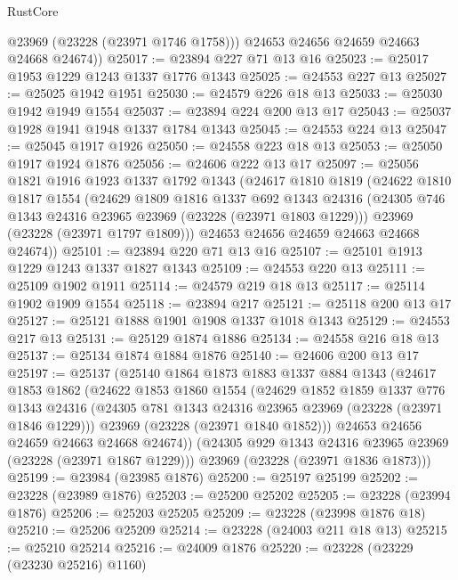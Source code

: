 \begin{lexlean}{RustCore}
\begin{coremodule}
          @23969
          (@23228 (@23971 @1746 @1758)))
        @24653
        @24656
        @24659
        @24663
        @24668
        @24674))
@25017 := @23894 @227 @71 @13 @16
@25023 := @25017 @1953 @1229 @1243 @1337 @1776 @1343
@25025 := @24553 @227 @13
@25027 := @25025 @1942 @1951
@25030 := @24579 @226 @18 @13
@25033 := @25030 @1942 @1949 @1554
@25037 := @23894 @224 @200 @13 @17
@25043 := @25037 @1928 @1941 @1948 @1337 @1784 @1343
@25045 := @24553 @224 @13
@25047 := @25045 @1917 @1926
@25050 := @24558 @223 @18 @13
@25053 := @25050 @1917 @1924 @1876
@25056 := @24606 @222 @13 @17
@25097 := @25056
    @1821
    @1916
    @1923
    @1337
    @1792
    @1343
    (@24617
      @1810
      @1819
      (@24622
        @1810
        @1817
        @1554
        (@24629
          @1809
          @1816
          @1337
          @692
          @1343
          @24316
          (@24305 @746 @1343 @24316 @23965 @23969 (@23228 (@23971 @1803 @1229)))
          @23969
          (@23228 (@23971 @1797 @1809)))
        @24653
        @24656
        @24659
        @24663
        @24668
        @24674))
@25101 := @23894 @220 @71 @13 @16
@25107 := @25101 @1913 @1229 @1243 @1337 @1827 @1343
@25109 := @24553 @220 @13
@25111 := @25109 @1902 @1911
@25114 := @24579 @219 @18 @13
@25117 := @25114 @1902 @1909 @1554
@25118 := @23894 @217
@25121 := @25118 @200 @13 @17
@25127 := @25121 @1888 @1901 @1908 @1337 @1018 @1343
@25129 := @24553 @217 @13
@25131 := @25129 @1874 @1886
@25134 := @24558 @216 @18 @13
@25137 := @25134 @1874 @1884 @1876
@25140 := @24606 @200 @13 @17
@25197 := @25137
    (@25140
      @1864
      @1873
      @1883
      @1337
      @884
      @1343
      (@24617
        @1853
        @1862
        (@24622
          @1853
          @1860
          @1554
          (@24629
            @1852
            @1859
            @1337
            @776
            @1343
            @24316
            (@24305 @781 @1343 @24316 @23965 @23969 (@23228 (@23971 @1846 @1229)))
            @23969
            (@23228 (@23971 @1840 @1852)))
          @24653
          @24656
          @24659
          @24663
          @24668
          @24674))
      (@24305 @929 @1343 @24316 @23965 @23969 (@23228 (@23971 @1867 @1229)))
      @23969
      (@23228 (@23971 @1836 @1873)))
@25199 := @23984 (@23985 @1876)
@25200 := @25197 @25199
@25202 := @23228 (@23989 @1876)
@25203 := @25200 @25202
@25205 := @23228 (@23994 @1876)
@25206 := @25203 @25205
@25209 := @23228 (@23998 @1876 @18)
@25210 := @25206 @25209
@25214 := @23228 (@24003 @211 @18 @13)
@25215 := @25210 @25214
@25216 := @24009 @1876
@25220 := @23228 (@23229 (@23230 @25216) @1160)

\end{coremodule}
\end{lexlean}

